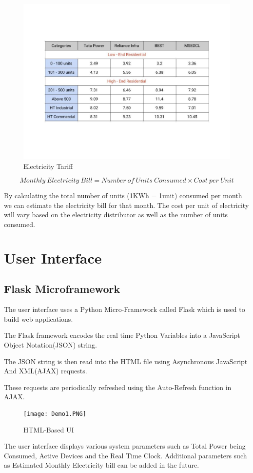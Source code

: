\begin{figure}[H]
	    \includegraphics[scale=0.45]{images/cost.jpg}
	    \centering
	    \caption{Electricity Tariff}
	    \label{cost}
	\end{figure}

\begin{equation}
    Monthly\ Electricity\ Bill = Number\ of\ Units\ Consumed \times Cost\ per\ Unit
\end{equation}

By calculating the total number of units (1KWh = 1unit) consumed per month we can estimate the electricity bill for that month. The cost per unit of electricity will vary based on the electricity distributor as well as the number of units consumed.


\section{User Interface}
{}


\subsection{Flask Microframework}
{The user interface uses a Python Micro-Framework called Flask which is used to build web applications.

The Flask framework encodes the real time Python Variables into a JavaScript Object Notation(JSON) string.

The JSON string is then read into the HTML file using Asynchronous JavaScript And XML(AJAX) requests. 

These requests are periodically refreshed using the Auto-Refresh function in AJAX.}
\begin{figure}[H]
	\texttt{[image: Demo1.PNG]} %
	\caption{HTML-Based UI}
	\label{UI}
\end{figure}
{The user interface displays various system parameters such as Total Power being Consumed, Active Devices and the Real Time Clock. Additional parameters such as Estimated Monthly Electricity bill can be added in the future.}


